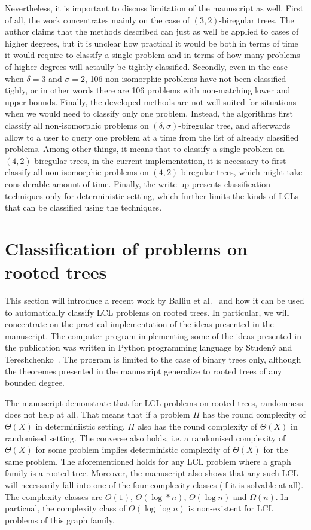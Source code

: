 Nevertheless, it is important to discuss limitation of the manuscript as well. First of all,
the work concentrates mainly on the case of $(3, 2)$-biregular trees. The author claims that
the methods described can just as well be applied to cases of higher degrees, but it is unclear
how practical it would be both in terms of time it would require to classify a single problem
and in terms of how many problems of higher degrees will actaully be tightly classified. Secondly,
even in the case when $\delta = 3$ and $\sigma = 2$, 106 non-isomorphic problems have not been
classified tighly, or in other words there are 106 problems with non-matching lower and upper bounds.
Finally, the developed methods are not well suited for situations when we would need to
classify only one problem. Instead, the algorithms first classify all non-isomorphic
problems on $(\delta, \sigma)$-biregular tree, and afterwards allow to a user to query
one problem at a time from the list of already classified problems. Among other things,
it means that to classify a single problem on $(4, 2)$-biregular trees, in the current
implementation, it is necessary to first classify all non-isomorphic problems on $(4, 2)$-biregular trees,
which might take considerable amount of time. Finally, the write-up presents classification
techniques only for deterministic setting, which further limits the kinds of LCLs that
can be classified using the techniques.

\section{Classification of problems on rooted trees}

This section will introduce a recent work by Balliu et al.~\cite{Balliu2021}
and how it can be used to automatically classify LCL problems on rooted trees.
In particular, we will concentrate on the practical implementation of the
ideas presented in the manuscript. The computer program implementing some of the ideas presented in the
publication was written in Python programming language by Studený and
Tereshchenko~\cite{Studeny2021}. The program is limited to the case
of binary trees only, although the theoremes presented in the manuscript
generalize to rooted trees of any bounded degree.

The manuscript demonstrate that for LCL problems on rooted trees,
randomness does not help at all. That means that if a problem $\Pi$
has the round complexity of $\Theta(X)$ in determiniistic setting, $\Pi$
also has the round complexity of $\Theta(X)$ in randomised setting. The
converse also holds, i.e. a randomised complexity of $\Theta(X)$ for some
problem implies deterministic complexity of $\Theta(X)$ for the same problem.
The aforementioned holds for any LCL problem where a graph family is
a rooted tree. Moreover, the manuscript also shows that any such LCL will
necessarily fall into one of the four complexity classes (if it is solvable at all). The complexity classes are $O(1)$, $\Theta(\log* n)$, $\Theta(\log n)$
and $\Omega(n)$. In particual, the complexity class of $\Theta(\log \log n)$
is non-existent for LCL problems of this graph family.

